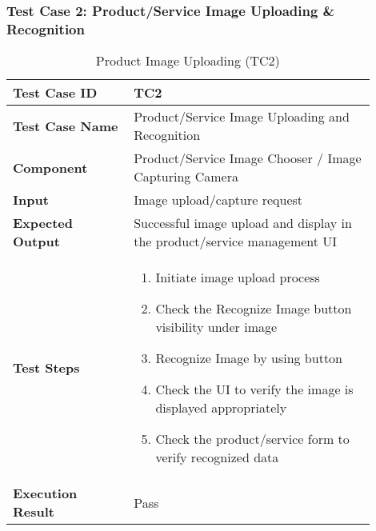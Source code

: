 \pagebreak
\begin{table}[h]
	\subsubsection{Test Case 2: Product/Service Image Uploading \& Recognition}
	\centering
	\caption{Product Image Uploading (TC2)}
	\begin{tabular}{|p{0.3\linewidth}|p{0.6\linewidth}|}
		\hline
		\textbf{Test Case ID} & TC2 \\
		\hline
		\textbf{Test Case Name} & Product/Service Image Uploading and Recognition \\
		\hline
		\textbf{Component} & Product/Service Image Chooser / Image Capturing Camera\\
		\hline
		\textbf{Input} & Image upload/capture request \\
		\hline
		\textbf{Expected Output} & Successful image upload and display in the product/service management UI \\
		\hline
		\textbf{Test Steps} & 
		\begin{enumerate}
			\item Initiate image upload process
			\item Check the Recognize Image button visibility under image
			\item Recognize Image by using button
			\item Check the UI to verify the image is displayed appropriately
			\item Check the product/service form to verify recognized data
		\end{enumerate} \\
		\hline
		\textbf{Execution Result} & Pass \\
		\hline
	\end{tabular}
\end{table}
\pagebreak

